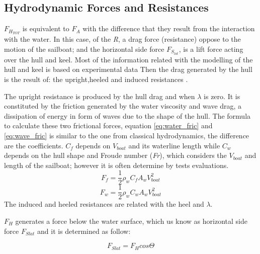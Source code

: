 \subsection {Hydrodynamic Forces and Resistances}
$F_{H_{TOT}}$ is equivalent to $F_{A}$ with the difference that they result from the interaction with the water. In this case, of the \textit{R}, a drag force (resistance) oppose to the motion of the sailboat; and the horizontal side force $F_{S_{lat}}$, is a lift force acting over the hull and keel. Most of the information related with the modelling of the hull and keel is based on experimental data%
Then the drag generated by the hull is the result of: the  upright,heeled and induced resistances \cite{philpott1993yacht}.\par

The upright resistance is produced by the hull drag and when $\lambda$ is zero. It is constituted by the friction generated by the water viscosity and wave drag, a dissipation of energy in form of waves due to the shape of the hull.  The  formula to calculate these two frictional forces, equation \ref{eq:water_fric} and \ref{eq:wave_fric} is similar to the one from classical hydrodynamics, the difference are the coefficients. $C_{f}$ depends on $V_{boat}$ and its waterline length while $C_{w}$ depends on the hull shape and Froude number (\textit{Fr}), which considers the $V_{boat}$ and length of the sailboat; however it is often determine by tests evaluations.
\begin{equation}\label{eq:water_fric}
 F_{f}=\frac{1}{2}\rho_{w} C_{f} A_{w} V_{boat}^2
\end{equation}
\begin{equation}\label{eq:wave_fric}
 F_{w}=\frac{1}{2}\rho_{w} C_{w} A_{w} V_{boat}^2
\end{equation}
The induced and heeled resistances are related with the heel and $\lambda$. 


$F_{H}$ generates a force below the water surface, which us know as horizontal side force $F_{Slat}$ and it is determined as follow: \par
\begin{equation}
    F_{Slat}= F_{H}cos \Theta
\end{equation}
